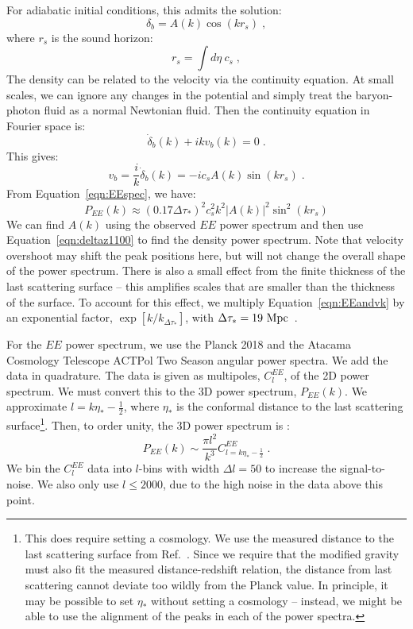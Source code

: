\documentclass[12pt,floats,floatfix,showpacs,amssymb,amsmath,prl,superscriptaddress,nofootinbib, aps]{revtex4-2}
\begin{document}
For adiabatic initial conditions, this admits the solution:
\begin{equation}\label{eqn:deltaz1100}
    \delta_b = A(k) \cos (kr_s) \; ,
\end{equation}
where $r_s$ is the sound horizon:
\begin{equation}
     r_s = \int d\eta~c_s \; ,
\end{equation}
The density can be related to the velocity via the continuity equation. At small scales, we can ignore any changes in the potential and simply treat the baryon-photon fluid as a normal Newtonian fluid. Then the continuity equation in Fourier space is:
\begin{equation}\label{eqn:continuity}
    \dot{\delta}_b(k) + ikv_b(k) = 0 \; .
\end{equation}
 This gives:
 \begin{equation}
      v_b = \frac{i}{k} \dot{\delta}_b(k) = - i  c_s A(k) \sin(k r_s) \; .
 \end{equation}
From Equation~\ref{eqn:EEspec}, we have:
\begin{equation}\label{eqn:EEandvk}
    P_{EE}(k) \approx (0.17 \Delta \tau_*)^2 c_s^2 k^2 |A(k)|^2 \sin^2(kr_s)
\end{equation}
We can find $A(k)$ using the observed $EE$ power spectrum and then use Equation~\ref{eqn:deltaz1100} to find the density power spectrum. Note that velocity overshoot may shift the peak positions here, but will not change the overall shape of the power spectrum. There is also a small effect from the finite thickness of the last scattering surface -- this amplifies scales that are smaller than the thickness of the surface. To account for this effect, we multiply Equation~\ref{eqn:EEandvk} by an exponential factor, $\exp[k/k_{\Delta \tau_*}]$, with $\Delta \tau_* = 19~\rm{Mpc}$~\citep{Hadzhiyska2019}.

For the $EE$ power spectrum, we use the Planck 2018 \citep{Planck2019} and the Atacama Cosmology Telescope ACTPol Two Season \citep{ACT2016} angular power spectra. We add the data in quadrature. The data is given as multipoles, $C_l^{EE}$, of the 2D power spectrum. We must convert this to the 3D power spectrum, $P_{EE}(k)$. We approximate $l = k\eta_* - \frac{1}{2}$, where $\eta_*$ is the conformal distance to the last scattering surface\footnote{This does require setting a cosmology. We use the measured distance to the last scattering surface from Ref.~\citep{Planck2018}. Since we require that the modified gravity must also fit the measured distance-redshift relation, the distance from last scattering cannot deviate too wildly from the Planck value. In principle, it may be possible to set $\eta_*$ without setting a cosmology -- instead, we might be able to use the alignment of the peaks in each of the power spectra.}\citep{Loverde2008}. Then, to order unity, the 3D power spectrum is \citep{Bond1987, Loverde2008}:
\begin{equation}
    P_{EE}(k) \sim \frac{\pi l^2}{k^3}C_{l=k\eta_{*}-\frac{1}{2}}^{EE} \; .
\end{equation}
We bin the $C_{l}^{EE}$ data into $l$-bins with width $\Delta l = 50$ to increase the signal-to-noise. We also only use $l\leq2000$, due to the high noise in the data above this point.
\end{document}
